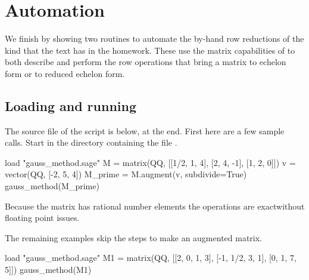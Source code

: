 \section{Automation}

We finish by showing two routines to automate the by-hand row reductions 
of the kind that the text has in the homework.
These use the matrix capabilities of \Sage{} to both describe 
and perform the row operations that bring a matrix to 
echelon form or to reduced echelon form. 

\subsection{Loading and running}
The source file of the script is below, at the end. 
First here are a few sample calls.
Start \Sage{} in the directory containing the file .
\begin{sageoutput}
load "gauss_method.sage"
M = matrix(QQ, [[1/2, 1, 4], [2, 4, -1], [1, 2, 0]])          
v = vector(QQ, [-2, 5, 4])
M_prime = M.augment(v, subdivide=True)  
gauss_method(M_prime)
\end{sageoutput}

Because the matrix has rational number elements the operations are 
exact\Dash without floating point issues.

The remaining examples skip the steps to make an augmented matrix. 
\begin{sageoutput}[d,0,1]
load "gauss_method.sage"
M1 = matrix(QQ, [[2, 0, 1, 3], [-1, 1/2, 3, 1], [0, 1, 7, 5]])
gauss_method(M1)
\end{sageoutput}

